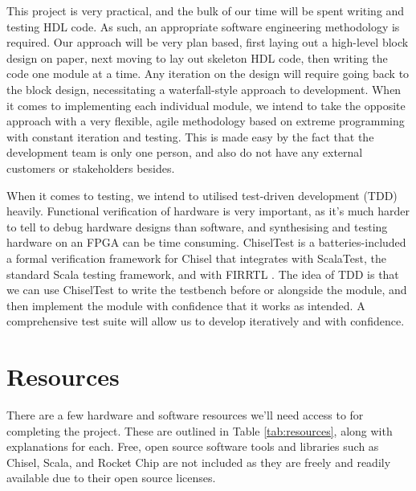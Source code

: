 \documentclass[a4paper,fleqn,12pt]{article}
\begin{document}
This project is very practical, and the bulk of our time will be spent writing and testing HDL code. As such, an appropriate software engineering methodology is required. Our approach will be very plan based, first laying out a high-level block design on paper, next moving to lay out skeleton HDL code, then writing the code one module at a time. Any iteration on the design will require going back to the block design, necessitating a waterfall-style approach to development. When it comes to implementing each individual module, we intend to take the opposite approach with a very flexible, agile methodology based on extreme programming with constant iteration and testing. This is made easy by the fact that the development team is only one person, and also do not have any external customers or stakeholders besides.

When it comes to testing, we intend to utilised test-driven development (TDD) heavily. Functional verification of hardware is very important, as it's much harder to tell to debug hardware designs than software, and synthesising and testing hardware on an FPGA can be time consuming. ChiselTest is a batteries-included a formal verification framework for Chisel that integrates with ScalaTest, the standard Scala testing framework, and with FIRRTL \citep{chiselverification}. The idea of TDD is that we can use ChiselTest to write the testbench before or alongside the module, and then implement the module with confidence that it works as intended. A comprehensive test suite will allow us to develop iteratively and with confidence.


\section{Resources}
There are a few hardware and software resources we'll need access to for completing the project. These are outlined in Table \ref{tab:resources}, along with explanations for each. Free, open source software tools and libraries such as Chisel, Scala, and Rocket Chip are not included as they are freely and readily available due to their open source licenses.
\end{document}
